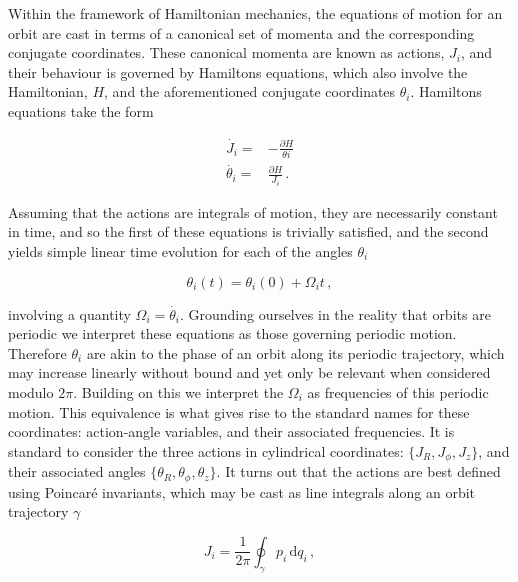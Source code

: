 
Within the framework of Hamiltonian mechanics, the equations of motion for an orbit are cast in terms of a canonical set of momenta and the corresponding conjugate coordinates. These canonical momenta are known as actions, $J_{i}$, and their behaviour is governed by Hamiltons equations, which also involve the Hamiltonian, $H$, and the aforementioned conjugate coordinates $\theta_{i}$. Hamiltons equations take the form

\begin{equation}
    \label{ch1:eq:hamiltons-equations}
\begin{split}
    \dot{J_{i}}= & -\frac{\partial H}{\theta{i}} \\
    \dot{\theta_{i}} = & \frac{\partial H}{J_{i}}\,.
\end{split}
\end{equation}

Assuming that the actions are integrals of motion, they are necessarily constant in time, and so the first of these equations is trivially satisfied, and the second yields simple linear time evolution for each of the angles $\theta_{i}$ 

\begin{equation}
    \label{ch1:eq:angle-evolution}
    \theta_{i}(t) = \theta_{i}(0) + \Omega_{i}t\,,
\end{equation}

\noindent involving a quantity $\Omega_{i} = \dot{\theta_{i}}$. Grounding ourselves in the reality that orbits are periodic we interpret these equations as those governing periodic motion. Therefore $\theta_{i}$ are akin to the phase of an orbit along its periodic trajectory, which may increase linearly without bound and yet only be relevant when considered modulo $2\pi$. Building on this we interpret the $\Omega_{i}$ as frequencies of this periodic motion. This equivalence is what gives rise to the standard names for these coordinates: action-angle variables, and their associated frequencies. It is standard to consider the three actions in cylindrical coordinates: $\{J_{R}, J_{\phi}, J_{z}\}$, and their associated angles $\{\theta_{R}, \theta_{\phi}, \theta_{z}\}$. It turns out that the actions are best defined using Poincar\'{e} invariants, which may be cast as line integrals along an orbit trajectory $\gamma$ 

\begin{equation}
    \label{ch1:eq:actions}
    J_{i} = \frac{1}{2\pi}\oint_{\gamma} p_{i}\, \mathrm{d}q_{i}\,,
\end{equation}


